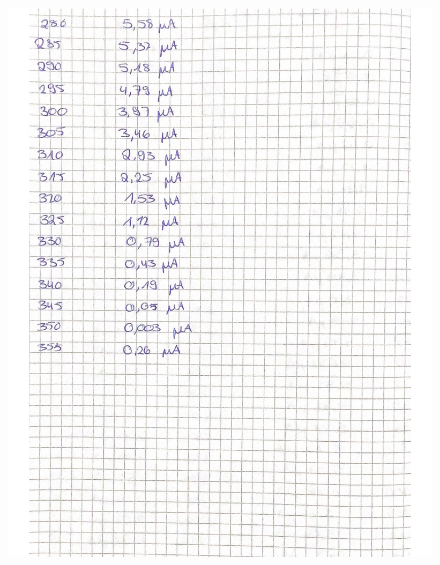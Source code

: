 \begin{figure}[H]
  \centering
  \includegraphics[width=\textwidth]{"Messwerte/V61Messdaten_05.pdf"}
  \label{fig:Messungen_5}
\end{figure}

